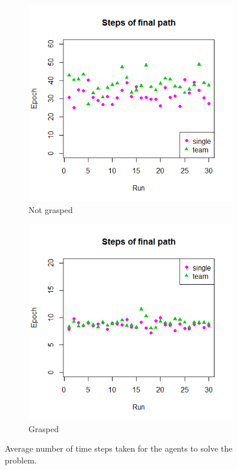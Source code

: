 \begin{figure}
	\centering	
	\begin{subfigure}{.48\textwidth}
		\centering
		\includegraphics[width=\textwidth]{images/Path_notgrabbed.png}
		\caption{Not grasped}
		\label{4c}		
	\end{subfigure}
	\begin{subfigure}{0.48\textwidth}
		\centering
		\includegraphics[width=\textwidth]{images/Path_grabbed.png}
		\caption{Grasped}
		\label{4d}		
	\end{subfigure}
	\caption{Average number of time steps taken for the agents to solve the problem.}
	\label{fig:Results4}
\end{figure}

